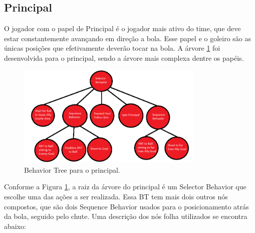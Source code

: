 \documentclass[10pt,fleqn,a4paper]{article}
\begin{document}
\subsection{Principal}

O jogador com o papel de Principal é o jogador mais ativo do time, que deve estar constantemente avançando em direção a bola. Esse papel e o goleiro são as únicas posições que efetivamente deverão tocar na bola. A árvore \ref{fig:principal_bt} foi desenvolvida para o principal, sendo a árvore mais complexa dentre os papéis.

\begin{figure}[H]
	\centering
	\includegraphics[width=0.8\textwidth]{figures/Principal_BT.png}
   	\caption{Behavior Tree para o principal.} \label{fig:principal_bt}
\end{figure}   

Conforme a Figura \ref{fig:principal_bt}, a raiz da árvore do principal é um Selector Behavior que escolhe uma das ações a ser realizada. Essa BT tem mais dois outros nós compostos, que são dois Sequence Behavior usados para o posicionamento atrás da bola, seguido pelo chute. Uma descrição dos nós folha utilizados se encontra abaixo:
\end{document}
